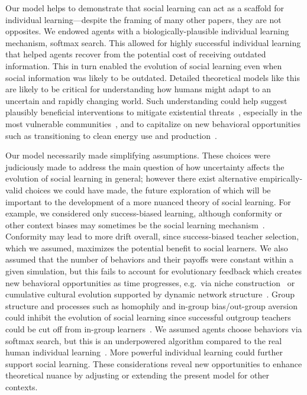 \documentclass[letterpaper,11.5pt]{scrartcl}
\begin{document}
Our model helps to demonstrate that social learning can act as a scaffold for individual learning---despite the framing of many other papers, they are not opposites. 
We endowed agents with a biologically-plausible individual learning mechanism, softmax search. This allowed for highly successful individual learning that helped agents recover from the potential cost of receiving outdated information. This in turn enabled the evolution of social learning 
even when social information was likely to be outdated. 
Detailed theoretical models like this are likely to be critical for understanding how humans might adapt to an uncertain and rapidly changing world.
Such understanding could help suggest plausibly beneficial interventions to mitigate existential threats~\cite{Moya2020,Jones2021}, especially in
the most vulnerable communities~\cite{McNamara2020}, and to capitalize on new behavioral opportunities such as transitioning to clean energy use and
production~\cite{NatureEnergyEditorialPromisesPremises2018,Brisbois2022}.

Our model necessarily made simplifying assumptions. These choices were judiciously made to address the main question of how uncertainty affects the evolution of social learning in general; however there exist alternative empirically-valid choices we could have made, the future exploration of which will be important to the development of a more nuanced theory of social learning.  %
For example, we considered only success-biased
learning, although conformity or other context biases may sometimes be the social learning mechanism~\cite{BoydRicherson1985,Muthukrishna2016a,Smaldino2018b}.  Conformity may lead to more drift
overall, since success-biased teacher selection, which we assumed, maximizes the potential benefit to social learners. We also assumed that the number of behaviors and
their payoffs were constant within a given simulation, but this fails to account for evolutionary feedback which
creates new behavioral opportunities as time progresses, e.g.\ via niche
construction~\cite{Smaldino2012a,Heras-Escribano2020} or cumulative cultural evolution
supported by dynamic network structure~\cite{Smolla2019,Derex2020}.  Group structure
and processes such as homophily and in-group bias/out-group aversion could inhibit the
evolution of social learning since successful outgroup teachers could be cut off from
in-group learners~\cite{Jackson2012}. We assumed agents choose behaviors via softmax
search, but this is an underpowered algorithm compared to the real human individual learning~\cite{Schulz2020a,Wu2022}.  More powerful individual learning could further
support social learning.  These considerations reveal new opportunities to enhance theoretical nuance by adjusting or extending the present model for other contexts. 
\end{document}
